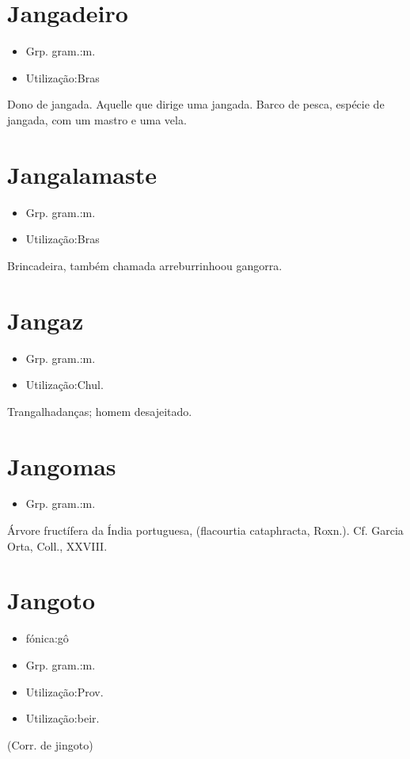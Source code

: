 \documentclass{article}
\begin{document}
\section{Jangadeiro}
\begin{itemize}
\item {Grp. gram.:m.}
\end{itemize}
\begin{itemize}
\item {Utilização:Bras}
\end{itemize}
Dono de jangada.
Aquelle que dirige uma jangada.
Barco de pesca, espécie de jangada, com um mastro e uma vela.
\section{Jangalamaste}
\begin{itemize}
\item {Grp. gram.:m.}
\end{itemize}
\begin{itemize}
\item {Utilização:Bras}
\end{itemize}
Brincadeira, também chamada \textunderscore arreburrinho\textunderscore  ou \textunderscore gangorra\textunderscore .
\section{Jangaz}
\begin{itemize}
\item {Grp. gram.:m.}
\end{itemize}
\begin{itemize}
\item {Utilização:Chul.}
\end{itemize}
Trangalhadanças; homem desajeitado.
\section{Jangomas}
\begin{itemize}
\item {Grp. gram.:m.}
\end{itemize}
Árvore fructífera da Índia portuguesa, (\textunderscore flacourtia cataphracta\textunderscore , Roxn.). Cf. Garcia Orta, \textunderscore Coll.\textunderscore , XXVIII.
\section{Jangoto}
\begin{itemize}
\item {fónica:gô}
\end{itemize}
\begin{itemize}
\item {Grp. gram.:m.}
\end{itemize}
\begin{itemize}
\item {Utilização:Prov.}
\end{itemize}
\begin{itemize}
\item {Utilização:beir.}
\end{itemize}
(Corr. de \textunderscore jingoto\textunderscore )
\end{document}
